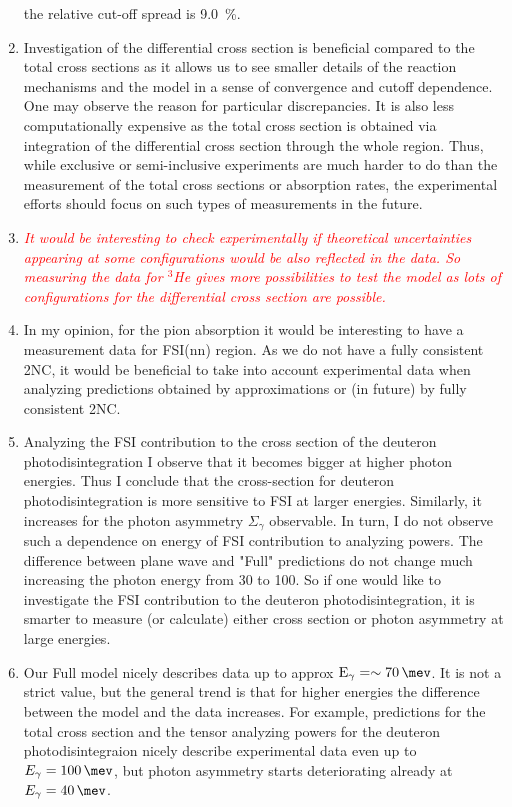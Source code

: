 \documentclass[a4paper, 14pt]{extarticle}
\providecommand{\tmp}[1]
{
\textcolor{red}{\textit{#1}}
}
\begin{document}
\begin{enumerate}
    the relative cut-off spread is \SI{9.0}{\percent}.
    \item Investigation of the differential cross section is beneficial compared to the total cross sections as it allows us to see smaller details of the reaction mechanisms and the model in a sense of convergence and cutoff dependence. One may observe the reason for particular discrepancies.
    It is also less computationally expensive as the total cross section is obtained via integration of the differential cross section through the whole region.
    Thus, while exclusive or semi-inclusive experiments are much harder to do than the measurement of the total
    cross sections or absorption rates, the experimental efforts should focus on such types of measurements in the future. 
    \item \tmp{It would be interesting to check experimentally if theoretical uncertainties appearing at some configurations would be also reflected in the data. So measuring the data for $^3$He gives more possibilities to test the model as lots of configurations for the differential cross section are possible.}
    \item In my opinion, for the pion absorption it would be interesting to have a measurement data for FSI(nn) region. As we do not have a fully consistent 2NC, it would be beneficial to take into account experimental data when analyzing predictions obtained by approximations or (in future) by fully consistent 2NC. 
    \item Analyzing the FSI contribution to the cross section of the deuteron photodisintegration 
    I observe that it becomes bigger at higher photon energies.
    Thus I conclude that the cross-section for deuteron photodisintegration is 
    more sensitive to FSI at larger energies.
    Similarly, it increases for the photon asymmetry $\Sigma_\gamma$ observable.
    In turn, I do not observe such a dependence on energy of FSI contribution to analyzing powers.
    The difference between plane wave and "Full"
    predictions do not change much increasing the photon energy from \SI{30}{\mev} to \SI{100}{\mev}.
    So if one would like to investigate the FSI contribution to the deuteron photodisintegration,
    it is smarter to measure (or calculate) either cross section or photon asymmetry at large energies.
    \item Our Full model nicely describes data up to approx $\text{E}_\gamma = \sim\SI{70}{\mev}$. It is not a strict value, but the general trend is that for higher energies the difference between the model and the data increases. For example, predictions for the total cross section and the tensor analyzing powers for the deuteron photodisintegraion nicely describe experimental data even up to $E_\gamma = \SI{100}{\mev}$, but photon asymmetry starts deteriorating already at $E_\gamma = \SI{40}{\mev}$.

\end{enumerate}
\end{document}
